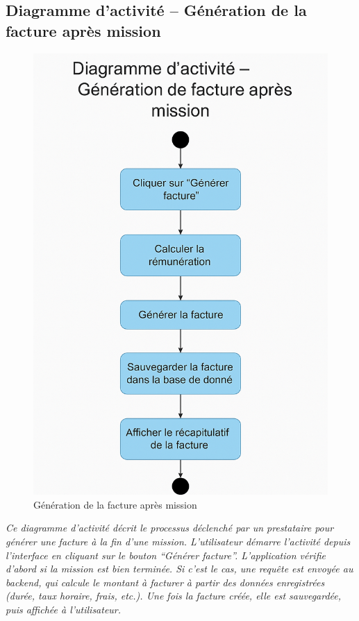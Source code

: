 \subsection*{Diagramme d’activité – Génération de la facture après mission}
\begin{figure}[H]
\centering
\includegraphics[width=0.85\linewidth]{figures/facture act.png}
\caption{Génération de la facture après mission}
\end{figure}

\textit{Ce diagramme d’activité décrit le processus déclenché par un prestataire pour générer une facture à la fin d’une mission. L’utilisateur démarre l’activité depuis l’interface en cliquant sur le bouton “Générer facture”. L’application vérifie d’abord si la mission est bien terminée. Si c’est le cas, une requête est envoyée au backend, qui calcule le montant à facturer à partir des données enregistrées (durée, taux horaire, frais, etc.). Une fois la facture créée, elle est sauvegardée, puis affichée à l’utilisateur.}


